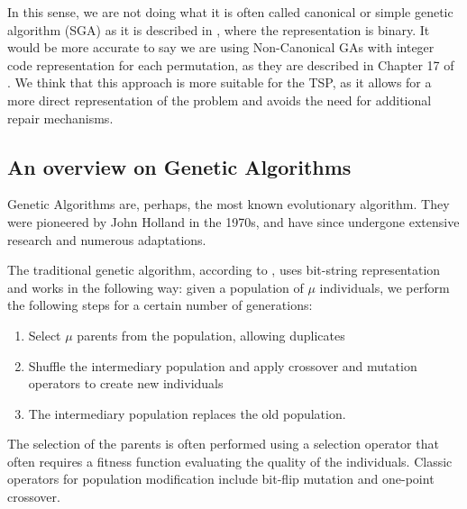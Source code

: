 \documentclass[11pt]{article}
\begin{document}
In this sense, we are not doing what it is often called canonical or simple genetic algorithm (SGA) as it is described in \cite{Eiben2003}, where the representation is binary. It would be more accurate to say we are using Non-Canonical GAs with integer code representation for each permutation, as they are described in Chapter 17 of \cite{Back2000}. We think that this approach is more suitable for the TSP, as it allows for a more direct representation of the problem and avoids the need for additional repair mechanisms.

\subsection{An overview on Genetic Algorithms}
Genetic Algorithms are, perhaps, the most known evolutionary algorithm. They were pioneered by John Holland in the 1970s, and have since undergone extensive research and numerous adaptations. 

The traditional genetic algorithm, according to \cite{Eiben2003}, uses bit-string representation and works in the following way:
given a population of $\mu$ individuals, we perform the following steps for a certain number of generations:
\begin{enumerate}
    \item Select $\mu$ parents from the population, allowing duplicates
    \item Shuffle the intermediary population and apply crossover and mutation operators to create new individuals
    \item The intermediary population replaces the old population.
\end{enumerate}

The selection of the parents is often performed using a selection operator that often requires a fitness function evaluating the quality of the individuals. Classic operators for population modification include bit-flip mutation and one-point crossover.
\end{document}
